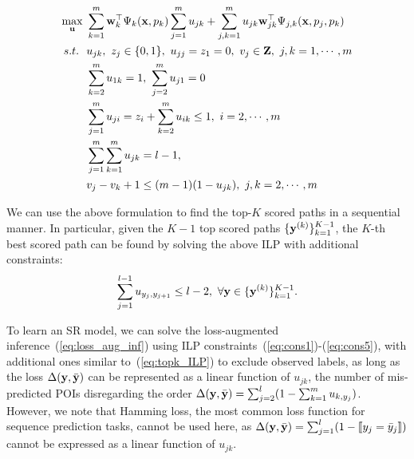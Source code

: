 \begin{alignat}{5}
\max_{\mathbf{u}} ~& \sum_{k=1}^m \mathbf{w}_k^\top \Psi_k(\mathbf{x}, p_k) \sum_{j=1}^m u_{jk}
+ \sum_{j,k=1}^m u_{jk} \mathbf{w}_{jk}^\top \Psi_{j, k}(\mathbf{x}, p_j, p_k)                                  \label{eq:obj} \\
s.t. ~~& u_{jk}, ~z_j \in \{0, 1\}, ~u_{jj} = z_1 = 0, ~v_j \in \mathbf{Z}, ~j,k = 1,\cdots,m   \label{eq:cons1} \\
  & \sum_{k=2}^m u_{1k} = 1, ~\sum_{j=2}^m u_{j1} = 0                                           \label{eq:cons2} \\
  & \sum_{j=1}^m u_{ji} = z_i + \sum_{k=2}^m u_{ik} \le 1, ~i = 2,\cdots,m                      \label{eq:cons3} \\
  & \sum_{j=1}^m \sum_{k=1}^m u_{jk} = l-1,                                                     \label{eq:cons4} \\
  & v_j - v_k + 1 \le (m-1) (1-u_{jk}), ~j,k = 2,\cdots,m                                       \label{eq:cons5}
\end{alignat}

We can use the above formulation to find the top-$K$ scored paths in a sequential manner. 
In particular, given the $K\!-\!1$ top scored paths $\{\mathbf{y}^{(k)}\}_{k=1}^{K-1}$, 
the $K\!$-th best scored path can be found by solving the above ILP with additional constraints:
\begin{equation}
\label{eq:topk_ILP}
\sum_{j=1}^{l-1} u_{y_j, y_{j+1}} \le l-2, ~\forall \mathbf{y} \in \{\mathbf{y}^{(k)}\}_{k=1}^{K-1}.
\end{equation}

To learn an SR model, we can solve the loss-augmented inference~(\ref{eq:loss_aug_inf}) 
using ILP constraints~(\ref{eq:cons1})-(\ref{eq:cons5}),
with additional ones similar to~(\ref{eq:topk_ILP}) to exclude observed labels,
as long as the loss $\Delta(\mathbf{y},\bar{\mathbf{y}})$ can be represented as a linear function of $u_{jk}$,
\eg the number of mis-predicted POIs disregarding the order $\Delta(\mathbf{y}, \bar{\mathbf{y}}) = \sum_{j=2}^l (1 - \sum_{k=1}^m u_{k, y_j})$.
However, we note that Hamming loss, the most common loss function for sequence prediction tasks,
cannot be used here, as $\Delta(\mathbf{y},\bar{\mathbf{y}}) = \sum_{j=1}^l (1 - \llbracket y_j = \bar y_j \rrbracket)$
cannot be expressed as a linear function of $u_{jk}$.

